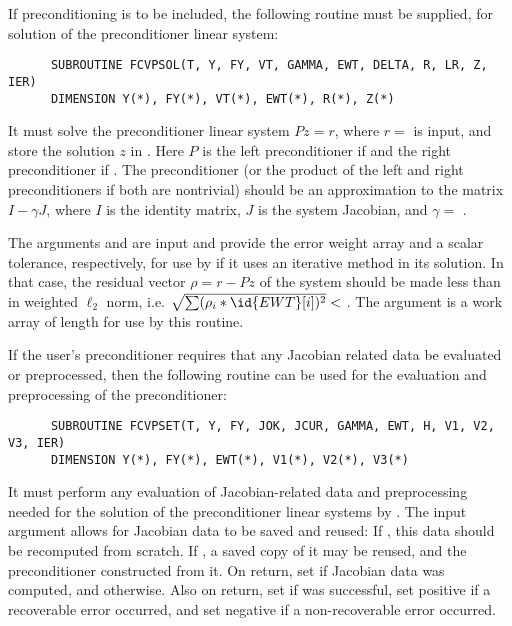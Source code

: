 \begin{Steps}
  If preconditioning is to be included, the following routine must be
  supplied, for solution of the preconditioner linear system:
\begin{verbatim}
      SUBROUTINE FCVPSOL(T, Y, FY, VT, GAMMA, EWT, DELTA, R, LR, Z, IER)
      DIMENSION Y(*), FY(*), VT(*), EWT(*), R(*), Z(*)
\end{verbatim}
  It must solve the preconditioner linear system $Pz = r$, where $r =$  
  is input, and store the solution $z$ in . Here $P$ is the left 
  preconditioner if  and the right preconditioner if .  
  The preconditioner (or the product of the left and right preconditioners 
  if both are nontrivial) should be an  approximation to the matrix 
  $I - \gamma J$, where $I$ is the identity matrix, $J$ is the system Jacobian,
  and $\gamma =$ .
  
  The arguments  and  are input and provide the error weight
  array and a scalar tolerance, respectively, for use by  if it uses
  an iterative method in its solution.  In that case, the residual vector
  $\rho = r - Pz$ of the system should be made less than  in weighted
  $\ell_2$ norm, i.e. $\sqrt{\sum(\rho_i * \id{EWT}[i])^2} < $ .
  The argument  is a work array of length  for use by this
  routine.

  If the user's preconditioner requires that any Jacobian related data be evaluated
  or preprocessed, then the following routine can be used for the evaluation and 
  preprocessing of the preconditioner:
\begin{verbatim}
      SUBROUTINE FCVPSET(T, Y, FY, JOK, JCUR, GAMMA, EWT, H, V1, V2, V3, IER)
      DIMENSION Y(*), FY(*), EWT(*), V1(*), V2(*), V3(*) 
\end{verbatim}
  It must perform any evaluation of Jacobian-related data and preprocessing needed
  for the solution of the preconditioner linear systems by .
  The input argument  allows for Jacobian data to be saved and reused:
  If , this data should be recomputed from scratch. If ,
  a saved copy of it may be reused, and the preconditioner constructed from it.
  On return, set  if Jacobian data was computed, and  otherwise.
  Also on return, set  if  was successful, set 
  positive if a recoverable error occurred, and set  negative if a 
  non-recoverable error occurred.
  

\end{Steps}
